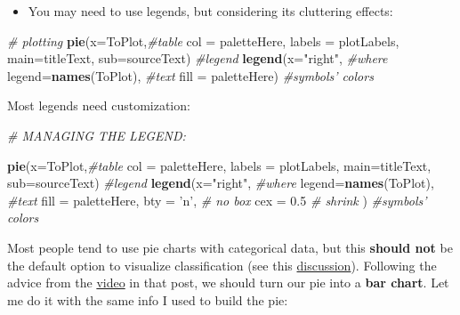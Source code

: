\documentclass[]{article}
\newenvironment{Shaded}{\begin{snugshade}}{\end{snugshade}}
\newcommand{\KeywordTok}[1]{\textcolor[rgb]{0.13,0.29,0.53}{\textbf{#1}}}
\newcommand{\DataTypeTok}[1]{\textcolor[rgb]{0.13,0.29,0.53}{#1}}
\newcommand{\FloatTok}[1]{\textcolor[rgb]{0.00,0.00,0.81}{#1}}
\newcommand{\StringTok}[1]{\textcolor[rgb]{0.31,0.60,0.02}{#1}}
\newcommand{\CommentTok}[1]{\textcolor[rgb]{0.56,0.35,0.01}{\textit{#1}}}
\newcommand{\NormalTok}[1]{#1}
\providecommand{\tightlist}{%
  \setlength{\itemsep}{0pt}\setlength{\parskip}{0pt}}
\begin{document}
\begin{itemize}
\tightlist
\item
  You may need to use legends, but considering its cluttering effects:
\end{itemize}

\begin{Shaded}
\begin{Highlighting}[]
\CommentTok{# plotting}
\KeywordTok{pie}\NormalTok{(}\DataTypeTok{x=}\NormalTok{ToPlot,}\CommentTok{#table}
    \DataTypeTok{col =}\NormalTok{ paletteHere, }
    \DataTypeTok{labels =}\NormalTok{ plotLabels,}
    \DataTypeTok{main=}\NormalTok{titleText,}
    \DataTypeTok{sub=}\NormalTok{sourceText)}
\CommentTok{#legend}
\KeywordTok{legend}\NormalTok{(}\DataTypeTok{x=}\StringTok{"right"}\NormalTok{, }\CommentTok{#where}
       \DataTypeTok{legend=}\KeywordTok{names}\NormalTok{(ToPlot), }\CommentTok{#text}
       \DataTypeTok{fill =}\NormalTok{ paletteHere) }\CommentTok{#symbols' colors}
\end{Highlighting}
\end{Shaded}

Most legends need customization:

\begin{Shaded}
\begin{Highlighting}[]
\CommentTok{# MANAGING THE LEGEND:}

\KeywordTok{pie}\NormalTok{(}\DataTypeTok{x=}\NormalTok{ToPlot,}\CommentTok{#table}
    \DataTypeTok{col =}\NormalTok{ paletteHere, }
    \DataTypeTok{labels =}\NormalTok{ plotLabels,}
    \DataTypeTok{main=}\NormalTok{titleText,}
    \DataTypeTok{sub=}\NormalTok{sourceText)}
\CommentTok{#legend}
\KeywordTok{legend}\NormalTok{(}\DataTypeTok{x=}\StringTok{"right"}\NormalTok{, }\CommentTok{#where}
       \DataTypeTok{legend=}\KeywordTok{names}\NormalTok{(ToPlot), }\CommentTok{#text}
       \DataTypeTok{fill =}\NormalTok{ paletteHere,}
       \DataTypeTok{bty =} \StringTok{'n'}\NormalTok{, }\CommentTok{# no box}
       \DataTypeTok{cex =} \FloatTok{0.5}  \CommentTok{# shrink}
\NormalTok{       ) }\CommentTok{#symbols' colors}
\end{Highlighting}
\end{Shaded}

Most people tend to use pie charts with categorical data, but this
\textbf{should not} be the default option to visualize classification
(see this
\href{https://medium.com/geckoboard-under-the-hood/think-before-you-pie-chart-and-more-effective-ways-to-visualize-your-data-862ea3456b26}{discussion}).
Following the advice from the
\href{https://www.youtube.com/watch?v=axx_MYb8-SI}{video} in that post,
we should turn our pie into a \textbf{bar chart}. Let me do it with the
same info I used to build the pie:
\end{document}
